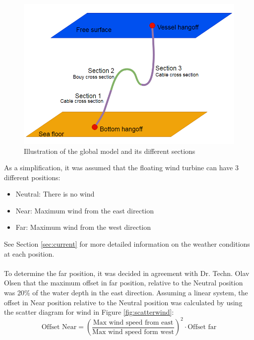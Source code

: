 \begin{figure}[H]
\centering
\includegraphics[scale=0.6]{figures/globalill}
\caption [$\; \:$ Illustration of the global model and its different sections ]{Illustration of the global model and its different sections}
 \label{fig:globalill}
\end{figure}
\noindent As a simplification, it was assumed that the floating wind turbine can have 3 different positions:
\begin{itemize}
    \item Neutral: There is no wind
    \item Near: Maximum wind from the east direction
    \item Far: Maximum wind from the west direction
\end{itemize}
See Section \ref{sec:current} for more detailed information on the weather conditions at each position. \\\\
To determine the far position, it was decided in agreement with Dr. Techn. Olav Olsen that the maximum offset in far position, relative to the Neutral position was 20\% of the water depth in the east direction. Assuming a linear system, the offset in Near position relative to the Neutral position was calculated by using the scatter diagram for wind in Figure \ref{fig:scatterwind}:
\begin{equation}
    \text{Offset Near}=\left(\frac{\text{Max  wind speed from east}}{\text{Max wind speed form west}}\right)^2 \cdot \text{Offset far}
\end{equation}

